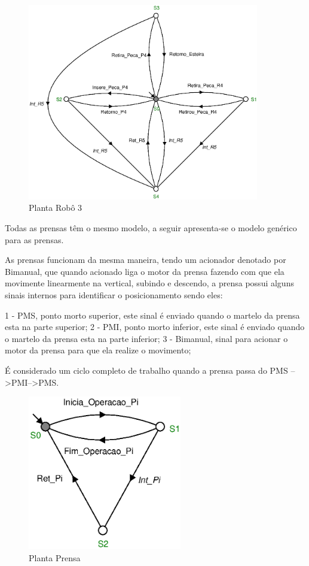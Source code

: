 \begin{figure}[H]%
    \centering
    \includegraphics[width=0.9\textwidth]{imagens/robo_5.eps}
    \caption{Planta Robô 3}\label{fig:robo5}
\end{figure}

Todas as prensas têm o mesmo modelo, a seguir apresenta-se o modelo genérico para as prensas.

As prensas funcionam da mesma maneira, tendo um acionador denotado por Bimanual, que quando acionado liga o motor da prensa fazendo com que ela movimente linearmente na vertical, subindo e descendo, a prensa possui alguns sinais internos para identificar o posicionamento sendo eles:

1 - PMS, ponto morto superior, este sinal é enviado quando o martelo da prensa esta na parte superior;
2 - PMI, ponto morto inferior, este sinal é enviado quando o martelo da prensa esta na parte inferior;
3 - Bimanual, sinal para acionar o motor da prensa para que ela realize o movimento; 

É considerado um ciclo completo de trabalho quando a prensa passa do PMS -->PMI-->PMS. 


\begin{figure}[H]%
    \centering
    \includegraphics[width=0.6\textwidth]{imagens/Prensa.eps}
    \caption{Planta Prensa}\label{fig:prensa}
\end{figure}

